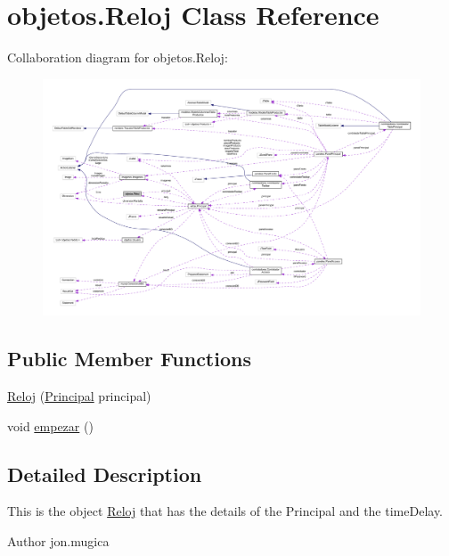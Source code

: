 \hypertarget{classobjetos_1_1_reloj}{}\section{objetos.\+Reloj Class Reference}
\label{classobjetos_1_1_reloj}


Collaboration diagram for objetos.\+Reloj\+:\nopagebreak
\begin{figure}[H]
\begin{center}
\leavevmode
\includegraphics[width=350pt]{classobjetos_1_1_reloj__coll__graph}
\end{center}
\end{figure}
\subsection*{Public Member Functions}
\begin{DoxyCompactItemize}
\item 
\mbox{\hyperlink{classobjetos_1_1_reloj_aa15ad3d750972a2e0778c54b07847b1a}{Reloj}} (\mbox{\hyperlink{classvistas_1_1_principal}{Principal}} principal)
\item 
void \mbox{\hyperlink{classobjetos_1_1_reloj_a8568b99d4457c01294d2078b033330a4}{empezar}} ()
\end{DoxyCompactItemize}


\subsection{Detailed Description}
This is the object \mbox{\hyperlink{classobjetos_1_1_reloj}{Reloj}} that has the details of the Principal and the time\+Delay.

\begin{DoxyAuthor}{Author}
jon.\+mugica 
\end{DoxyAuthor}



